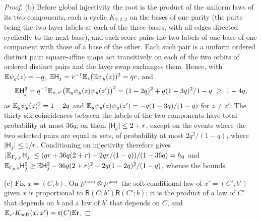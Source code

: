 \begin{proof}
(b) Before global injectivity the root is the product of the uniform laws of its two
components, each a cyclic $K_{2,2,2}$ on the bases of one parity (the
parts being the two layer labels at each of the three bases, with all
edges directed cyclically to the next base), and each score pairs the
two labels of one base of one component with those of a base of the other. Each such pair
is a uniform ordered distinct pair: square-affine maps act transitively on each of the
two orbits of ordered distinct pairs and the layer swap exchanges them. Hence, with
$\mathbb E\psi_y(z)=-q$, $\mathbb E\mathsf H_{j}=r^{-1}\mathbb E_z(\mathbb E\psi_y(z))^2=qr$, and
\[
 \mathbb E\mathsf H_{j}^2=q^{-1}\mathbb E_{z,z'}\bigl(\mathbb E_y\psi_y(z)\psi_y(z')\bigr)^2
 =(1-2q)^2+q(1-3q)^2/1-q\ \ge\ 1-4q,
\]
as $\mathbb E_y\psi_y(z)^2=1-2q$ and $\mathbb E_y\psi_y(z)\psi_y(z')=-q(1-3q)/(1-q)$ for $z\ne z'$. The
thirty-six coincidences between the labels of the two components have total probability
at most $36q$; on them $|\mathsf H_{j}|\le2+r$, except on the events where the two selected pairs
are equal as sets, of probability at most $2q^2/(1-q)$, where $|\mathsf H_{j}|\le1/r$. Conditioning
on injectivity therefore gives
$|\mathbb E_{\Gamma_{p,0}}\mathsf H_{j}|\le(qr+36q(2+r)+2qr/(1-q))/(1-36q)=h_0$ and
$\mathbb E_{\Gamma_{p,0}}\mathsf H_{j}^2\ge\mathbb E\mathsf H_{j}^2-36q(2+r)^2-2q(1-2q)^2/(1-q)$, whence the bounds.

(c) Fix $x=(C,b)$. On $\mu^{\rm core}\otimes\mu^{\rm pair}$ the soft conditional law of $x'=(C',b')$ given $x$ is
proportional to $\mathsf R(C;b')\mathsf R(C';b)$; it is the product of a law of $C'$ that
depends on $b$ and a law of $b'$ that depends on $C$, and
$\mathbb E_{x'}K_{\rm soft}(x,x')=\mathfrak r(C)\mathbb E\mathfrak r$.


\end{proof}
